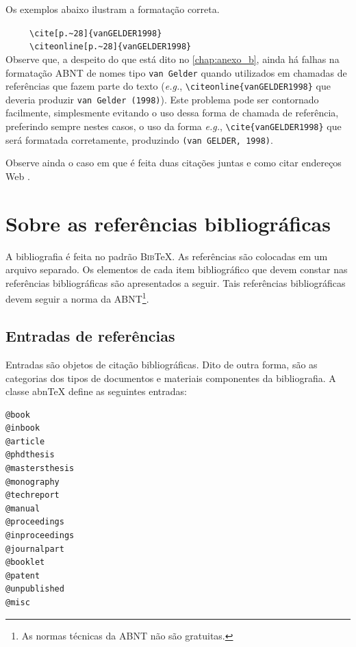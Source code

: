 \begin{apendicesenv}
Os exemplos abaixo ilustram a formatação correta.

\cite[p.~28]{vanGELDER1998} \ \ \ \ \  \verb|\cite[p.~28]{vanGELDER1998}|\\
 \ \ \ \ \  \verb|\citeonline[p.~28]{vanGELDER1998}|\\

Observe que, a despeito do que está dito no \autoref{chap:anexo_b}, ainda há falhas na formatação ABNT de nomes tipo \verb|van Gelder| quando utilizados em chamadas de referências que fazem parte do texto (\textit{e.g.}, \verb|\citeonline{vanGELDER1998}| que deveria produzir \verb|van Gelder (1998)|). Este problema pode ser contornado facilmente, simplesmente evitando o uso dessa forma de chamada de referência, preferindo sempre nestes casos, o uso da forma \textit{e.g.}, \verb|\cite{vanGELDER1998}| que será formatada corretamente, produzindo \verb|(van GELDER, 1998)|.

Observe ainda o caso em que é feita duas citações juntas \cite{Santos2003, Neubert2001} e como citar endereços Web \cite{IRL2014}.


\chapter{Sobre as referências bibliográficas}
\label{chap:sobre_as_referencias_bibliograficas}

A bibliografia é feita no padrão \textsc{Bib}\TeX{}. As referências são colocadas em um arquivo separado. Os elementos de cada item bibliográfico que devem constar nas referências bibliográficas são apresentados a seguir. Tais referências bibliográficas devem seguir a norma  da ABNT\footnote{As normas técnicas da ABNT não são gratuitas.}.

\section{Entradas de referências}
\label{sec:entradas_de_referencias}

Entradas são objetos de citação bibliográficas. Dito de outra forma, são as categorias dos tipos de documentos e materiais componentes da bibliografia. A classe abn\TeX{} define as seguintes entradas:

\begin{verbatim}
@book
@inbook
@article
@phdthesis
@mastersthesis
@monography
@techreport
@manual
@proceedings
@inproceedings
@journalpart
@booklet
@patent
@unpublished
@misc
\end{verbatim}


\end{apendicesenv}
